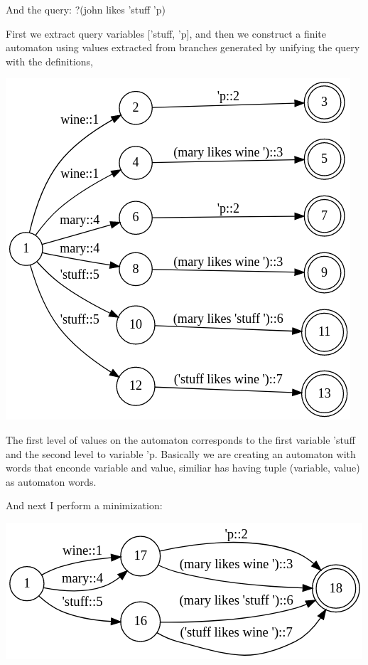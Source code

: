 \documentclass{article}
\begin{document}
And the query: ?(john likes 'stuff 'p)

First we extract query variables ['stuff, 'p], and then we construct a finite automaton using 
values extracted from branches generated by unifying the query with the definitions,

\includegraphics{sources/posts/variables domain (part 1)/john_likes_nfa.png}

The first level of values on the automaton corresponds to the first variable 'stuff and the 
second level to variable 'p. Basically we are creating an automaton with words that enconde variable and value, 
similiar has having tuple (variable, value) as automaton words.

And next I perform a minimization:

\includegraphics{sources/posts/variables domain (part 1)/john_likes_min.png}
\end{document}
